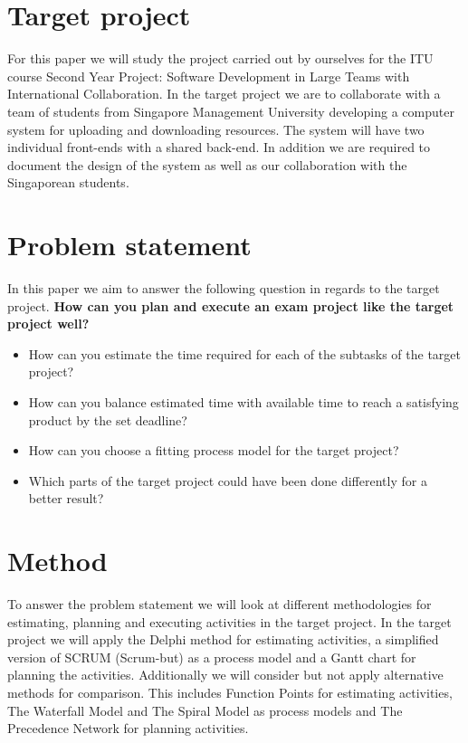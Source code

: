\documentclass[../report.tex]{subfiles}
\begin{document}
\graphicspath{{img/}{../img/}}

\section*{Target project}
For this paper we will study the project carried out by ourselves for the ITU course 
Second Year Project: Software Development in Large Teams with International Collaboration.
In the target project we are to collaborate with a team of students from Singapore Management University
developing a computer system for uploading and downloading resources. The system will have two
individual front-ends with a shared back-end. In addition we are required to document the design
of the system as well as our collaboration with the Singaporean students.

\section*{Problem statement}
In this paper we aim to answer the following question in regards to the target project.
\newline	
\textbf{How can you plan and execute an exam project like the target project well?}
\begin{itemize}
	\item	How can you estimate the time required for each of the subtasks of the target project?
	\item 	How can you balance estimated time with available time to reach a satisfying product by the set deadline?
	\item 	How can you choose a fitting process model for the target project?
	\item 	Which parts of the target project could have been done differently for a better result?
\end{itemize}

\section*{Method}

To answer the problem statement we will look at different methodologies for estimating, planning and executing activities in the target project. In the target project we will apply the Delphi method for estimating activities, a simplified version of SCRUM (Scrum-but) as a process model and a Gantt chart for planning the activities. Additionally we will consider but not apply alternative methods for comparison. This includes Function Points for estimating activities, The Waterfall Model and The Spiral Model as process models and The Precedence Network for planning activities. 
\end{document}
